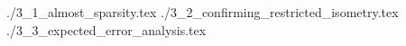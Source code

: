 \startchapter [title={Theorems and Proofs}]

 {./3_1_almost_sparsity.tex}
 {./3_2_confirming_restricted_isometry.tex}
 {./3_3_expected_error_analysis.tex}

\stopchapter
